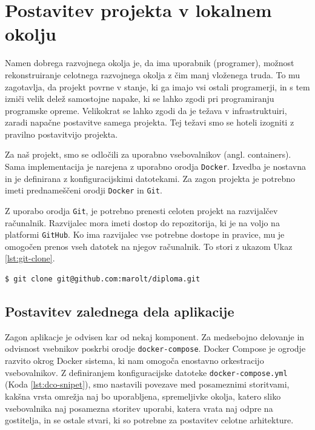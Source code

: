 \documentclass[a4paper, 12pt]{book}
\begin{document}
\section{Postavitev projekta v lokalnem okolju}

Namen dobrega razvojnega okolja je, da ima uporabnik (programer), možnost rekonstruiranje celotnega razvojnega okolja z čim manj vloženega truda. To mu zagotavlja, da projekt povrne v stanje, ki ga imajo vsi ostali programerji, in s tem izniči velik delež samostojne napake, ki se lahko zgodi pri programiranju programske opreme. Velikokrat se lahko zgodi da je težava v infrastruktuiri, zaradi napačne postavitve samega projekta. Tej težavi smo se hoteli izogniti z pravilno postavitvijo projekta.

Za naš projekt, smo se odločili za uporabno vsebovalnikov (angl. containers). Sama implementacija je narejena z uporabno orodja \verb=Docker=. Izvedba je nostavna in je definirana z konfiguracijskimi datotekami. Za zagon projekta je potrebno imeti prednameščeni orodji \verb=Docker= in \verb=Git=.

Z uporabo orodja \verb=Git=, je potrebno prenesti celoten projekt na razvijalčev računalnik. Razvijalec mora imeti dostop do repozitorija, ki je na voljo na platformi \verb=GitHub=. Ko ima razvijalec vse potrebne dostope in pravice, mu je omogočen prenos vseh datotek na njegov računalnik. 
To stori z ukazom Ukaz \ref{lst:git-clone}.

\begin{lstlisting}[language=bash,style=mystyle,caption={Uporaba orodja Git, za prenos projekta},label=lst:git-clone]
$ git clone git@github.com:marolt/diploma.git
\end{lstlisting}

\subsection{Postavitev zalednega dela aplikacije}
Zagon aplikacje je odvisen kar od nekaj komponent. Za medsebojno delovanje in odvisnost vsebnikov poskrbi orodje \verb=docker-compose=. Docker Compose je ogrodje razvito okrog Docker sistema, ki nam omogoča enostavno orkestracijo vsebovalnikov. Z definiranjem konfiguracijske datoteke \verb=docker-compose.yml= (Koda \ref{lst:dco-snipet}), smo nastavili povezave med posameznimi storitvami, kakšna vrsta omrežja naj bo uporabljena, spremeljivke okolja, katero sliko vsebovalnika naj posamezna storitev uporabi, katera vrata naj odpre na gostitelja, in se ostale stvari, ki so potrebne za postavitev celotne arhitekture.
\end{document}
